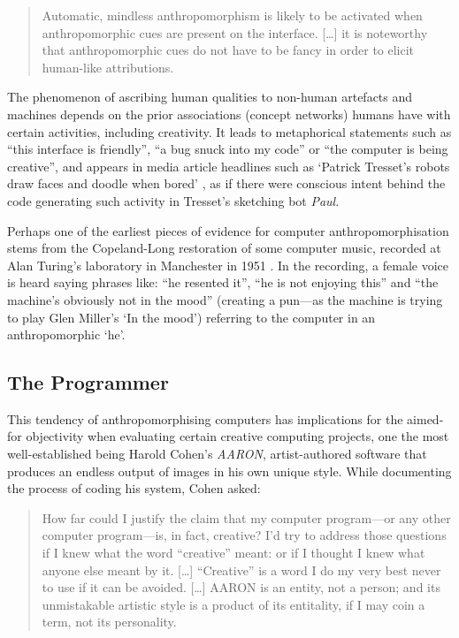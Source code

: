 \begin{quotation}
  Automatic, mindless anthropomorphism is likely to be activated when anthropomorphic cues are present on the interface. [\ldots] it is noteworthy that anthropomorphic cues do not have to be fancy in order to elicit human-like attributions. 
\end{quotation}

The phenomenon of ascribing human qualities to non-human artefacts and machines depends on the prior associations (concept networks) humans have with certain activities, including creativity. It leads to metaphorical statements such as ``this interface is friendly'', ``a bug snuck into my code'' or ``the computer is being creative'', and appears in media article headlines such as `Patrick Tresset\rq s robots draw faces and doodle when bored' \autocite{Wired2011}, as if there were conscious intent behind the code generating such activity in Tresset's sketching bot \textit{Paul}.

Perhaps one of the earliest pieces of evidence for computer anthropomorphisation stems from the Copeland-Long restoration of some computer music, recorded at Alan Turing's laboratory in Manchester in 1951 \autocite{Copeland2016}. In the recording, a female voice is heard saying phrases like: ``he resented it'', ``he is not enjoying this'' and ``the machine's obviously not in the mood'' (creating a pun---as the machine is trying to play Glen Miller's `In the mood') referring to the computer in an anthropomorphic `he'.


\subsection{The Programmer}
\label{s:programmer}

This tendency of anthropomorphising computers has implications for the aimed-for objectivity when evaluating certain creative computing projects, one the most well-established being Harold Cohen's \textit{AARON}, artist-authored software that produces an endless output of images in his own unique style. While documenting the process of coding his system, Cohen asked:

\begin{quotation}
  How far could I justify the claim that my computer program---or any other computer program---is, in fact, creative? I'd try to address those questions if I knew what the word ``creative'' meant: or if I thought I knew what anyone else meant by it. [\ldots] ``Creative'' is a word I do my very best never to use if it can be avoided. [\ldots] AARON is an entity, not a person; and its unmistakable artistic style is a product of its entitality, if I may coin a term, not its personality. 
\end{quotation}

